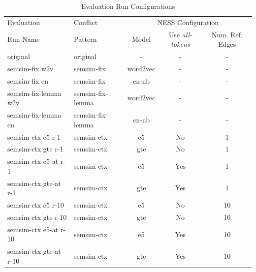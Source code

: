 \documentclass[11pt]{scrreprt}
\begin{document}
\begin{table}
\centering
\begin{tabular}{llccc}
\toprule
\multicolumn{1}{l}{Evaluation} & \multicolumn{1}{l}{Conflict} & \multicolumn{3}{c}{NESS Configuration} \\
\cmidrule{3-5}
\multicolumn{1}{l}{Run Name}   & \multicolumn{1}{l}{Pattern}  & \multicolumn{1}{c}{Model}	& \multicolumn{1}{c}{Use \textit{all-tokens}} & \multicolumn{1}{c}{Num. Ref. Edges} \\
\midrule
original                       & original                     & -                          & -                                         & - \\
semsim-fix w2v                 & semsim-fix                   & word2vec                   & -                                         & - \\
semsim-fix cn                 & semsim-fix                   & cn-nb                      & -                                         & - \\
semsim-fix-lemma w2v           & semsim-fix-lemma             & word2vec                   & -                                         & - \\
semsim-fix-lemma cn           & semsim-fix-lemma             & cn-nb                      & -                                         & - \\
semsim-ctx e5 r-1                & semsim-ctx                   & e5                         & No                                        & 1 \\
semsim-ctx gte r-1               & semsim-ctx                   & gte                        & No                                        & 1 \\
semsim-ctx e5-at r-1             & semsim-ctx                   & e5                         & Yes                                       & 1 \\
semsim-ctx gte-at r-1            & semsim-ctx                   & gte                        & Yes                                       & 1 \\
semsim-ctx e5 r-10               & semsim-ctx                   & e5                         & No                                        & 10 \\
semsim-ctx gte r-10              & semsim-ctx                   & gte                        & No                                        & 10 \\
semsim-ctx e5-at r-10            & semsim-ctx                   & e5                         & Yes                                       & 10 \\
semsim-ctx gte-at r-10           & semsim-ctx                   & gte                        & Yes                                       & 10 \\
\bottomrule
\end{tabular}
\caption{Evaluation Run Configurations}
\label{tab:evaluation-run-configs}
\end{table}
\end{document}
